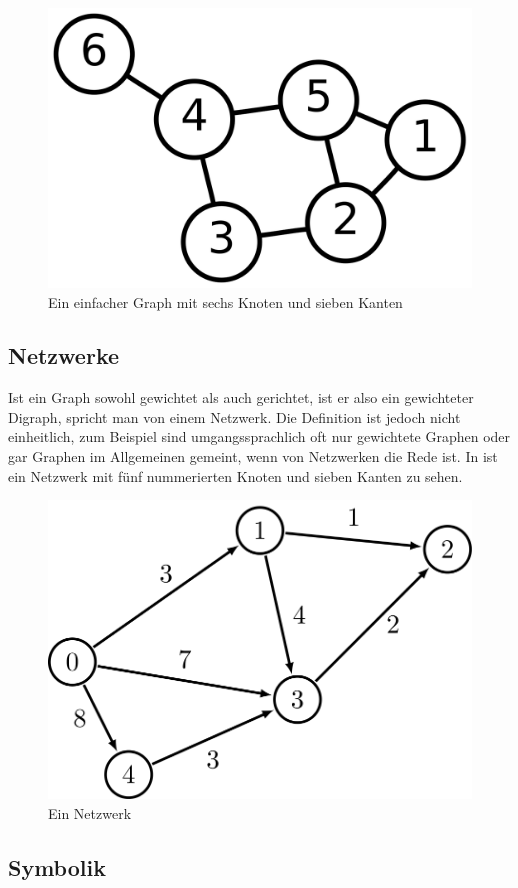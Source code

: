             \begin{figure}
                \centering
                \includegraphics[width=0.5\linewidth]{images/graph.png}
                \caption{Ein einfacher Graph mit sechs Knoten und sieben Kanten\\\cite{EZ:Web25}}
                \label{fig:graph}
            \end{figure}

        \subsection{Netzwerke}
            
            Ist ein Graph sowohl gewichtet als auch gerichtet, ist er also ein gewichteter Digraph, spricht man von einem Netzwerk. Die Definition ist jedoch nicht einheitlich, zum Beispiel sind umgangssprachlich oft nur gewichtete Graphen oder gar Graphen im Allgemeinen gemeint, wenn von Netzwerken die Rede ist. In  ist ein Netzwerk mit fünf nummerierten Knoten und sieben Kanten zu sehen. \cite{EZ:Web09, EZ:Web25}
            
            \begin{figure}
                \centering
                \includegraphics[width=0.5\linewidth]{images/network.png}
                \caption{Ein Netzwerk\\\cite{EZ:Web10}}
                \label{fig:network}
            \end{figure}

        \subsection{Symbolik}

